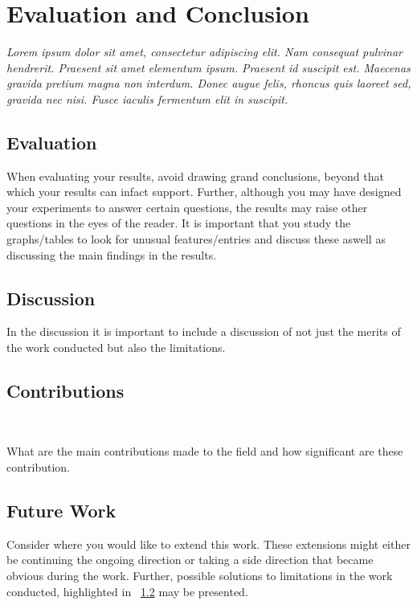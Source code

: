 \chapter{Evaluation and Conclusion}
\label{cha:evaluationAndConclusion}

{\it Lorem ipsum dolor sit amet, consectetur adipiscing elit. Nam consequat pulvinar hendrerit. Praesent sit amet elementum ipsum. Praesent id suscipit est. Maecenas gravida pretium magna non interdum. Donec augue felis, rhoncus quis laoreet sed, gravida nec nisi. Fusce iaculis fermentum elit in suscipit. }

\section{Evaluation}
\label{sec:Evaluation}

When evaluating your results, avoid drawing grand conclusions, beyond that which your results can infact support. Further, although you may have designed your experiments to answer certain questions, the results may raise other questions in the eyes of the reader. It is important that you study the graphs/tables to look for unusual features/entries and discuss these aswell as discussing the main findings in the results. 

\section{Discussion}
\label{sec:Discussion}

In the discussion it is important to include a discussion of not just the merits of the work conducted but also the limitations. 

\section{Contributions}~\label{cont}
\label{sec:Contributions}

What are the main contributions made to the field and how significant are these contribution.  

\section{Future Work}
\label{sec:futureWork}

Consider where you would like to extend this work. These extensions might either be continuing the ongoing direction or taking a side direction that became obvious during the work. Further, possible solutions to limitations in the work conducted, highlighted in ~\ref{sec:Discussion} may be presented. 
